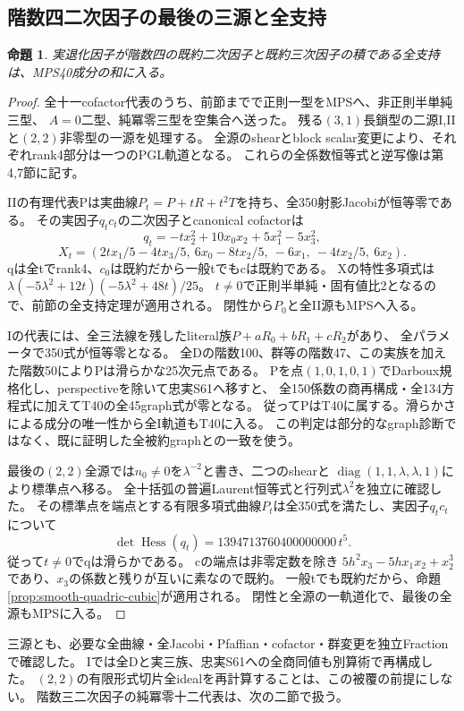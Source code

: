 \documentclass[a4paper,11pt]{ltjsarticle}
\newtheorem{proposition}{命題}[section]
\theoremstyle{definition}
\begin{document}
\subsection{階数四二次因子の最後の三源と全支持}
\begin{proposition}\label{prop:rank4-quadric-cubic}
実退化因子が階数四の既約二次因子と既約三次因子の積である全支持は、MPS40成分の和に入る。
\end{proposition}
\begin{proof}
全十一cofactor代表のうち、前節までで正則一型をMPSへ、非正則半単純三型、
$A=0$二型、純冪零三型を空集合へ送った。
残る$(3,1)$長鎖型の二源I,IIと$(2,2)$非零型の一源を処理する。
全源のshearとblock scalar変更により、それぞれrank4部分は一つのPGL軌道となる。
これらの全係数恒等式と逆写像は第4,7節に記す。

IIの有理代表Pは実曲線$P_t=P+tR+t^2T$を持ち、全350射影Jacobiが恒等零である。
その実因子$q_tc_t$の二次因子とcanonical cofactorは
\[
 q_t=-t x_2^2+10x_0x_2+5x_1^2-5x_3^2,
\]
\[
 X_t=(2tx_1/5-4tx_3/5,\ 6x_0-8tx_2/5,\ -6x_1,\ -4tx_2/5,\ 6x_2).
\]
qは全tでrank4、$c_0$は既約だから一般tでもcは既約である。
Xの特性多項式は$\lambda(-5\lambda^2+12t)(-5\lambda^2+48t)/25$。
$t\ne0$で正則半単純・固有値比2となるので、前節の全支持定理が適用される。
閉性から$P_0$と全II源もMPSへ入る。

Iの代表には、全三法線を残したliteral族$P+aR_0+bR_1+cR_2$があり、
全パラメータで350式が恒等零となる。
全Dの階数100、群等の階数47、この実族を加えた階数50によりPは滑らかな25次元点である。
Pを点$(1,0,1,0,1)$でDarboux規格化し、perspectiveを除いて忠実S61へ移すと、
全150係数の商再構成・全134方程式に加えてT40の全45graph式が零となる。
従ってPはT40に属する。滑らかさによる成分の唯一性から全I軌道もT40に入る。
この判定は部分的なgraph診断ではなく、既に証明した全被約graphとの一致を使う。

最後の$(2,2)$全源では$n_0\ne0$を$\lambda^{-2}$と書き、二つのshearと
$\operatorname{diag}(1,1,\lambda,\lambda,1)$により標準点へ移る。
全十括弧の普遍Laurent恒等式と行列式$\lambda^2$を独立に確認した。
その標準点を端点とする有限多項式曲線$P_t$は全350式を満たし、実因子$q_tc_t$について
\[
 \det\operatorname{Hess}(q_t)=1394713760400000000\,t^5.
\]
従って$t\ne0$でqは滑らかである。
cの端点は非零定数を除き
$5h^2x_3-5hx_1x_2+x_2^3$であり、$x_3$の係数と残りが互いに素なので既約。
一般tでも既約だから、命題\ref{prop:smooth-quadric-cubic}が適用される。
閉性と全源の一軌道化で、最後の全源もMPSに入る。
\end{proof}
三源とも、必要な全曲線・全Jacobi・Pfaffian・cofactor・群変更を独立Fractionで確認した。
Iでは全Dと実三族、忠実S61への全商同値も別算術で再構成した。
$(2,2)$の有限形式切片全idealを再計算することは、この被覆の前提にしない。
階数三二次因子の純冪零十二代表は、次の二節で扱う。
\end{document}
